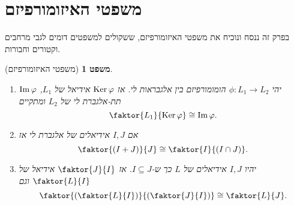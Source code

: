 \documentclass{report}
\theoremstyle{break}
\newtheorem{theorem}{משפט}[chapter]
\theoremstyle{MyNonumberbreak}
\begin{document}
\section{משפטי האיזומורפיזם}
בפרק זה ננסח ונוכיח את משפטי האיזומורפיזם, ששקולים למשפטים דומים לגבי מרחבים וקטורים וחבורות.
\begin{theorem}[משפטי האיזומורפיזם]\label{thm:isomorphism}
\begin{enumerate}
	\item
	יהי $\phi : L_1 \to L_2$ הומומורפיזם בין אלגבראות לי. אז $\operatorname{Ker}\varphi$ אידיאל של $L_1$, $\operatorname{Im}\varphi$ תת-אלגברת לי של $L_2$ ומתקיים
	\[ \faktor{L_1}{\Ker\phi} \cong \Img\phi. \]
	\item 
	אם $I, J$ אידיאלים של אלגברת לי אז
	\[ \faktor{(I + J)}{J} \cong \faktor{I}{(I \cap J)}. \]
	\item
	יהיו $I, J$ אידיאלים של $L$ כך ש-$I \subseteq J$. אז $\faktor{J}{I}$ אידיאל של $\faktor{L}{I}$ וגם
	\[ \faktor{(\faktor{L}{I})}{(\faktor{J}{I})} \cong \faktor{L}{J}. \]
\end{enumerate}
\end{theorem}
\end{document}
